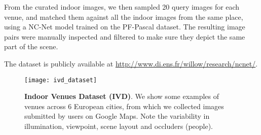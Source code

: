 \documentclass{article}
\begin{document}
From the curated indoor images, we then sampled 20 query images for each venue, and matched them against all the indoor images from the same place, using a NC-Net model trained on the PF-Pascal dataset. The resulting image pairs were manually inspected and filtered to make sure they depict the same part of the scene. 

The dataset is publicly available at \url{http://www.di.ens.fr/willow/research/ncnet/}.

\begin{figure}[tbp]
  \centering
  \texttt{[image: ivd\_dataset]}
\caption{{\bf Indoor Venues Dataset (IVD)}. We show some examples of venues across 6 European cities, from which we collected images submitted by users on Google Maps. Note the variability in illumination, viewpoint, scene layout and occluders (people).}
  \label{fig:ivd-dataset}
\end{figure}
 
\end{document}
